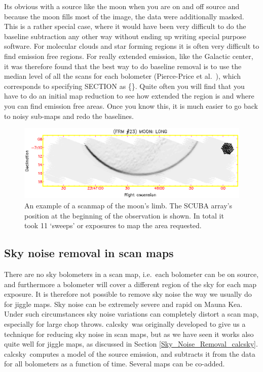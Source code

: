 \documentclass[twoside,11pt]{article}
\newcommand{\task}[1]{\textsf{#1}}
\newcommand{\calcsky}{\xref{\task{calcsky}}{sun216}{CALCSKY}}
\newcommand{\xref}[3]{#1}
\newcommand{\xlabel}[1]{}
\renewcommand{\_}{\texttt{\symbol{95}}}
\begin{document}
Its obvious with a source like the moon when you are on and off source
and because the moon fills most of the image, the data were
additionally masked.  This is a rather special case, where it would
have been very difficult to do the baseline subtraction any other way
without ending up writing special purpose software.  For molecular
clouds and star forming regions it is often very difficult to find
emission free regions.  For really extended emission, like the
Galactic center, it was therefore found that the best way to do
baseline removal is to use the median level of all the scans for each
bolometer (Pierce-Price et al.\  \cite{Pierce00}), which corresponds to
specifying SECTION as \{\}.  Quite often you will find that you have to
do an initial map reduction to see how extended the region is and
where you can find emission free areas.  Once you know this, it is
much easier to go back to noisy sub-maps and redo the baselines.


\begin{figure}
\begin{center}
\includegraphics[width=\textwidth]{sc11_fig8.eps}
\caption{An example of a scanmap of the moon's limb. The SCUBA 
array's position at the beginning of the observation is shown.  In
total it took 11 `sweeps' or exposures to map the area requested.}

\label{fig:moon}
\end{center}
\end{figure}

\subsection{\xlabel{scan_maps_calcsky}Sky noise removal in scan maps
\label{scan_maps_calcsky}}

There are no sky bolometers in a scan map, i.e.\ each bolometer can be
on source, and furthermore a bolometer will cover a different region
of the sky for each map exposure.  It is therefore not possible to
remove sky noise the way we usually do for jiggle maps.  Sky noise can
be extremely severe and rapid on Mauna Kea.  Under such circumstances
sky noise variations can completely distort a scan map, especially for
large chop throws.  \calcsky\ was originally developed to give us a
technique for reducing sky noise in scan maps, but as we have seen it
works also quite well for jiggle maps, as discussed in Section
\ref{Sky_Noise_Removal_calcsky}.  \calcsky\ computes a model of the
source emission, and subtracts it from the data for all bolometers as
a function of time. Several maps can be co-added.
\end{document}
